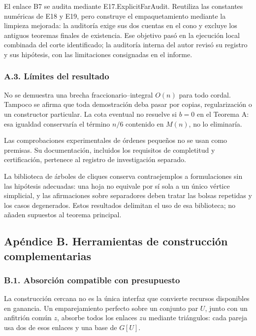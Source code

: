 \documentclass[spanish,11pt,a4paper]{article}
\begin{document}
El enlace B7 se audita mediante {\ttfamily\small E17.\discretionary{\hbox{\ensuremath{\hookrightarrow}}}{}{}ExplicitFarA\discretionary{\hbox{\ensuremath{\hookrightarrow}}}{}{}udit}. Reutiliza las constantes numéricas de {\ttfamily\small E18} y {\ttfamily\small E19}, pero construye el empaquetamiento mediante la limpieza mejorada: la auditoría exige sus dos cuentas en el cono y excluye los antiguos teoremas finales de existencia. Ese objetivo pasó en la ejecución local combinada del corte identificado; la auditoría interna del autor revisó su registro y sus hipótesis, con las limitaciones consignadas en el informe.

\subsubsection{A.3. Límites del resultado}\label{a.3.-limites-del-resultado}

No se demuestra una brecha fraccionario--integral \(O(n)\) para todo cordal. Tampoco se afirma que toda demostración deba pasar por copias, regularización o un constructor particular. La cota eventual no resuelve si \(b=0\) en el Teorema A: esa igualdad conservaría el término \(n/6\) contenido en \(M(n)\), no lo eliminaría.

Las comprobaciones experimentales de órdenes pequeños no se usan como premisas. Su documentación, incluidos los requisitos de completitud y certificación, pertenece al registro de investigación separado.

La biblioteca de árboles de cliques conserva contraejemplos a formulaciones sin las hipótesis adecuadas: una hoja no equivale por sí sola a un único vértice simplicial, y las afirmaciones sobre separadores deben tratar las bolsas repetidas y los casos degenerados. Estos resultados delimitan el uso de esa biblioteca; no añaden supuestos al teorema principal.

\subsection{Apéndice B. Herramientas de construcción complementarias}\label{apendice-b.-herramientas-de-construccion-complementarias}

\subsubsection{B.1. Absorción compatible con presupuesto}\label{b.1.-absorcion-compatible-con-presupuesto}

La construcción cercana no es la única interfaz que convierte recursos disponibles en ganancia. Un emparejamiento perfecto sobre un conjunto par \(U\), junto con un anfitrión común \(z\), absorbe todos los enlaces \(zu\) mediante triángulos: cada pareja usa dos de esos enlaces y una base de \(G[U]\).
\end{document}
